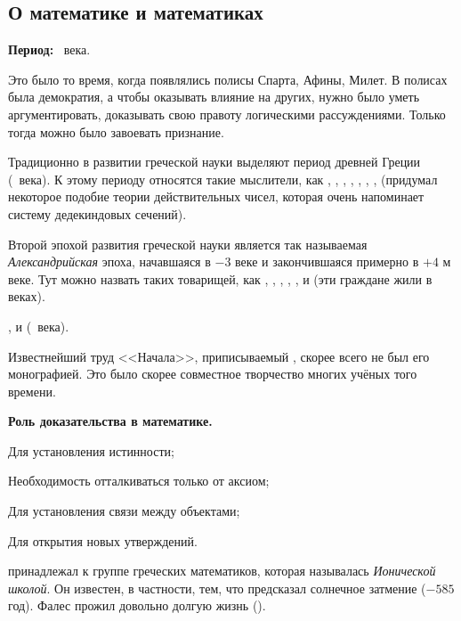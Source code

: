 \documentclass[a4paper,oneside,fleqn,10pt]{article}
\begin{document}
\subsection{О математике и математиках}

\textbf{Период:} ~века.

Это было то время, когда появлялись полисы Спарта, Афины, Милет.  В
полисах была демократия, а чтобы оказывать влияние на других, нужно
было уметь аргументировать, доказывать свою правоту логическими
рассуждениями. Только тогда можно было завоевать признание.

Традиционно в развитии греческой науки выделяют период древней Греции
(~века).  К этому периоду относятся такие мыслители, как
, , ,
, , , ,
 (придумал некоторое подобие теории действительных чисел,
которая очень напоминает систему дедекиндовых сечений).

Второй эпохой развития греческой науки является так называемая
\emph{Александрийская} эпоха, начавшаяся в $-3$ веке и закончившаяся
примерно в $+4$ м веке.  Тут можно назвать таких товарищей, как
, , , ,
,  и  (эти граждане жили в  веках).

,  и 
(~века).  

Известнейший труд <<Начала>>, приписываемый ,
скорее всего не был его монографией. Это было скорее совместное
творчество многих учёных того времени.

\textbf{Роль доказательства в математике.}

\begin{items}{-2}
\item Для установления истинности;
\item Необходимость отталкиваться только от аксиом;
\item Для установления связи между объектами;
\item Для открытия новых утверждений.
\end{items}

 принадлежал к группе греческих математиков,
которая называлась \emph{Ионической школой}.  Он известен, в
частности, тем, что предсказал солнечное затмение ($-585$ год). Фалес
прожил довольно долгую жизнь ().
\end{document}
